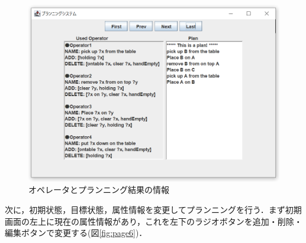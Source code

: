 \documentclass[12pt]{jarticle}
\begin{document}
\begin{figure}[htbp]
  \begin{center}
    \includegraphics[scale=0.6]{images/page5.PNG}
    \caption{オペレータとプランニング結果の情報}
    \label{fig:page5}
  \end{center}
\end{figure}

\clearpage
次に，初期状態，目標状態，属性情報を変更してプランニングを行う．まず初期画面の左上に現在の属性情報があり，これを左下のラジオボタンを追加・削除・編集ボタンで変更する(図\ref{fig:page6})．\\
\end{document}
